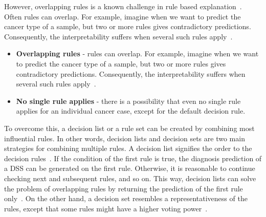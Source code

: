 \hspace*{3.5mm} However, overlapping rules is a known challenge in rule based explanation~\cite{molnar2019interpretable}. Often rules can overlap. For example, imagine when we want to predict the cancer type of a sample, but two or more rules gives contradictory predictions. Consequently, the interpretability suffers when several such rules apply~\cite{molnar2019interpretable}. 

\begin{itemize}[noitemsep]
    \item \textbf{Overlapping rules} - rules can overlap. For example, imagine when we want to predict the cancer type of a sample, but two or more rules gives contradictory predictions. Consequently, the interpretability suffers when several such rules apply~\cite{molnar2019interpretable}. 
    \item \textbf{No single rule applies} - there is a possibility that even no single rule applies for an individual cancer case, except for the default decision rule.  
\end{itemize}

\hspace*{3.5mm} To overcome this, a decision list or a rule set can be created by combining most influential rules. In other words, decision lists and decision sets are two main strategies for combining multiple rules. 
A decision list signifies the order to the decision rules~\cite{molnar2019interpretable}. If the condition of the first rule is true, the diagnosis prediction of a DSS can be generated on the first rule. Otherwise, it is reasonable to continue checking next and subsequent rules, and so on. This way, decision lists can solve the problem of overlapping rules by returning the prediction of the first rule only~\cite{molnar2019interpretable}. On the other hand, a decision set resembles a representativeness of the rules, except that some rules might have a higher voting power~\cite{molnar2019interpretable}. 

